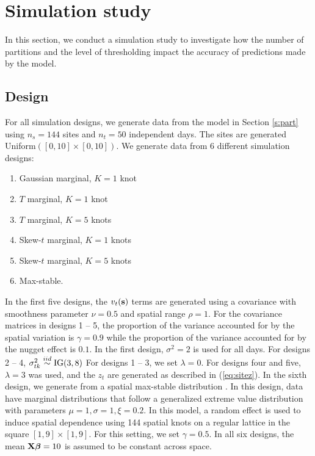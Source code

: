 \documentclass[11pt]{article}
\begin{document}
\section{Simulation study}\label{s:simstudy}
In this section, we conduct a simulation study to investigate how the number of partitions and the level of thresholding impact the accuracy of predictions made by the model.

\subsection{Design}\label{s:simdesign}
For all simulation designs, we generate data from the model in Section \ref{s:part} using $n_s=144$ sites and $n_t=50$ independent days.
The sites are generated Uniform$([0, 10] \times [0, 10])$.
We generate data from 6 different simulation designs:
\begin{enumerate} \setlength{\itemsep}{-0.5em}
  \item Gaussian marginal, $K=1$ knot
  \item $T$ marginal, $K=1$ knot
  \item $T$ marginal, $K=5$ knots
  \item Skew-$t$ marginal, $K=1$ knots
  \item Skew-$t$ marginal, $K=5$ knots
  \item Max-stable.
\end{enumerate}
In the first five designs, the $v_t(\mbox{\bf s})$ terms are generated using a \Matern covariance with smoothness parameter $\nu = 0.5$ and spatial range $\rho = 1$.
For the covariance matrices in designs 1 -- 5, the proportion of the variance accounted for by the spatial variation is $\gamma = 0.9$ while the proportion of the variance accounted for by the nugget effect is $0.1$.
In the first design, $\sigma^2 = 2$ is used for all days.
For designs 2 -- 4, $\sigma^2_{tk} \stackrel{iid}{\sim} \text{IG}(3, 8)$
For designs 1 -- 3, we set $\lambda = 0$.
For designs four and five, $\lambda = 3$ was used, and the $z_t$ are generated as described in (\ref{eq:sitez}).
In the sixth design, we generate from a spatial max-stable distribution \citep{Reich2012}.
In this design, data have marginal distributions that follow a generalized extreme value distribution with parameters $\mu = 1, \sigma=1, \xi=0.2$.
In this model, a random effect is used to induce spatial dependence using 144 spatial knots on a regular lattice in the square $[1, 9] \times [1, 9]$.
For this setting, we set $\gamma = 0.5$.
In all six designs, the mean $\mbox{\bf X} \mbox{\boldmath $\beta$} = 10$ is assumed to be constant across space.
\end{document}

